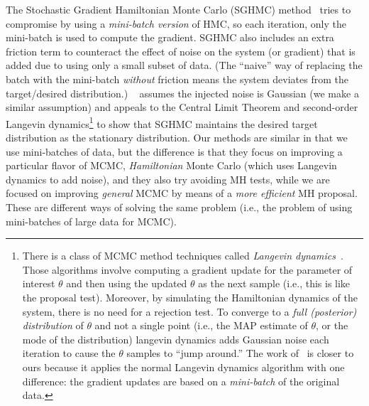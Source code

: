 \documentclass{article}
\begin{document}
The Stochastic Gradient Hamiltonian Monte Carlo (SGHMC) method~
\cite{sghmc_2014} tries to compromise
by using a \emph{mini-batch version} of HMC, so each iteration, only the mini-batch is used to
compute the gradient.  SGHMC also includes an extra friction term to counteract the effect of noise
on the system (or gradient) that is added due to using only a small subset of data. (The ``naive''
way of replacing the batch with the mini-batch \emph{without} friction means the system deviates
from the target/desired distribution.) ~\cite{sghmc_2014} assumes the injected noise is Gaussian (we
make a similar assumption) and appeals to the Central Limit Theorem and second-order Langevin
dynamics\footnote{There is a class of MCMC method techniques called \emph{Langevin dynamics}~\cite{mcmc_hamiltonian_2010}. Those algorithms involve computing a gradient update for the parameter of interest $\theta$ and then using the updated $\theta$ as the next sample (i.e., this is like the proposal test). Moreover, by simulating the Hamiltonian dynamics of the system, there is no need for a rejection test. To converge to a \emph{full (posterior) distribution} of $\theta$ and not a single point (i.e., the MAP estimate of $\theta$, or the mode of the distribution) langevin dynamics adds Gaussian noise each iteration to cause the $\theta$ samples to ``jump around.'' The work of~\cite{langevin_2011} is closer to ours because it applies the normal Langevin dynamics algorithm with one difference: the gradient updates are based on a \emph{mini-batch} of the original data.} to show that SGHMC maintains the desired target distribution as the stationary
distribution. Our methods are similar in that we use mini-batches of data, but the difference is
that they focus on improving a particular flavor of MCMC, \emph{Hamiltonian} Monte Carlo (which uses Langevin dynamics to add noise), and they
also try avoiding MH tests, while we are focused on improving \emph{general} MCMC by means of a \emph{more efficient} MH proposal. These are different ways of solving the same problem (i.e., the problem of using mini-batches of
large data for MCMC).
\end{document}
